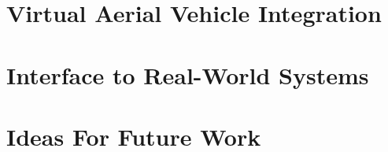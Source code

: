 \section{Virtual Aerial Vehicle Integration}\label{sec:AirSimIntegration}


\section{Interface to Real-World Systems}

\section{Ideas For Future Work}